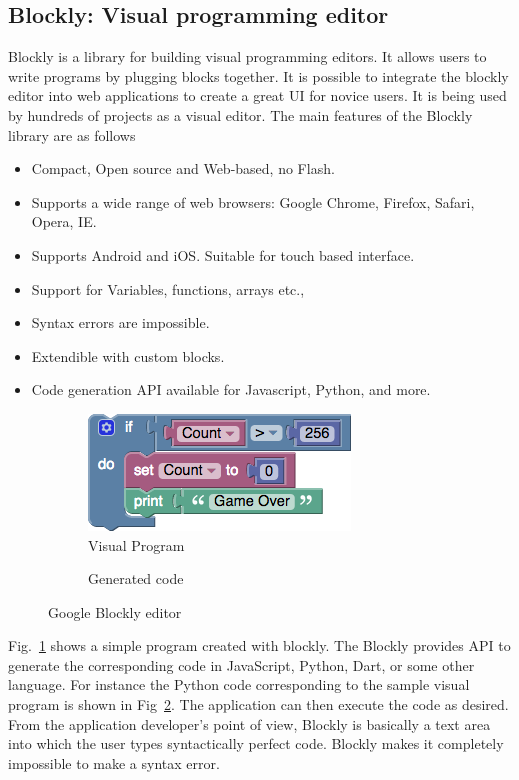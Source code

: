 \subsection{Blockly: Visual programming editor}
Blockly \cite{Blockly} is a library for building visual programming editors. It allows users to write programs by plugging blocks together. It is possible to integrate the blockly editor into web applications to create a great UI for novice users. It is being used by hundreds of projects as a visual editor. The main features of the Blockly library are as follows
\begin{itemize}[leftmargin={1cm},topsep={0pt},itemsep={0pt},partopsep={0pt},parsep={0pt}] 
\item Compact, Open source and Web-based, no Flash.
\item Supports a wide range of web browsers: Google Chrome, Firefox, Safari, Opera, IE.
\item Supports Android and iOS. Suitable for touch based interface.
\item Support for Variables, functions, arrays etc.,
\item Syntax errors are impossible.
\item Extendible with custom blocks.
\item Code generation API available for Javascript, Python, and more.
\end{itemize}
\begin{figure}[H]
\begin{subfigure}[h]{0.4\textwidth}
\includegraphics[width=\textwidth]{assets/blockly_sample.png}
\caption[Visual Program]{Visual Program}
\label{fig:blockly_sample}
\end{subfigure}
\hfill
\begin{subfigure}[h]{0.48\textwidth}

\caption[Generated code]{Generated code}
\label{fig:blockly_sample_code}
\end{subfigure}
\caption[Google Blockly editor]{Google Blockly editor}
\label{fig:pseudo_nodes}
\end{figure}
Fig.~\ref{fig:blockly_sample} shows a simple program created with blockly. The Blockly provides API to generate the corresponding code in JavaScript, Python, Dart, or some other language. For instance the Python code corresponding to the sample visual program is shown in Fig~\ref{fig:blockly_sample_code}. The application can then execute the code as desired. From the application developer's point of view, Blockly is basically a text area into which the user types syntactically perfect code. Blockly makes it completely impossible to make a syntax error.

